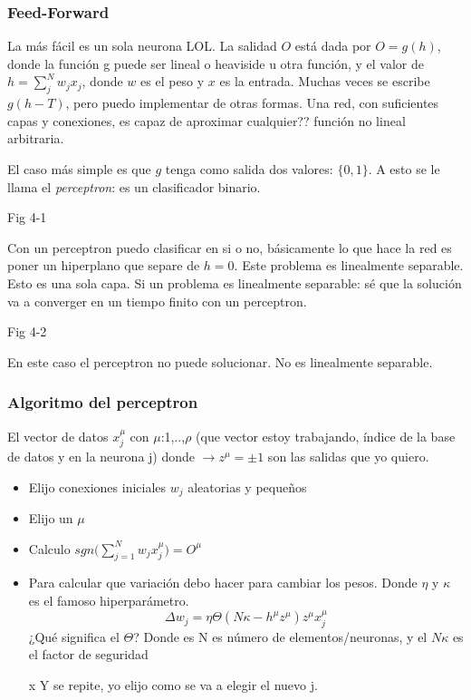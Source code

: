 \subsubsection{Feed-Forward}
La más fácil es un sola neurona LOL. La salidad $O$ está dada por $O= g(h)$, donde la función g puede ser lineal o heaviside u otra función, y el valor de $h= \sum_j^N w_j x_j$,  donde $w$ es el peso y $x$ es la entrada. Muchas veces se escribe $g(h-T)$, pero puedo implementar de otras formas. Una red, con suficientes capas y conexiones, es capaz de aproximar cualquier?? función no lineal  arbitraria.

El caso más simple es que $g$ tenga como salida dos valores: $\{ 0, 1\}$. A esto se le llama el {\sl perceptron}: es un clasificador binario.

Fig 4-1

Con un perceptron puedo clasificar en si o no, básicamente lo que hace  la red es poner un hiperplano que separe de $h=0$. Este problema es linealmente separable. Esto es una sola capa. Si un problema es linealmente separable: sé que la solución va a converger en un tiempo finito con un perceptron.

Fig 4-2

En este caso el perceptron no puede solucionar. No es linealmente separable. 


\subsubsection{Algoritmo del perceptron}

El vector de datos $x_j^{\mu}$ con $\mu$:1,..,$\rho$ (que vector estoy trabajando, índice de la base de datos y en la neurona j) donde $\rightarrow z^\mu=\pm1$ son las salidas que yo quiero.

\begin{itemize}
	\item Elijo conexiones iniciales $w_j$ aleatorias y pequeños
	\item Elijo un $\mu$
	\item Calculo $sgn\big(\sum^N_{j=1} w_j x_j^\mu \big) = O^{\mu}$
	\item Para calcular que variación debo hacer para cambiar los pesos. Donde $\eta$ y $\kappa$ es el famoso hiperparámetro.
	\begin{equation}
		\Delta w_j = \eta \Theta(N\kappa - h^\mu z^\mu) z^\mu x_j^\mu 
	\end{equation}
	¿Qué significa el $\Theta$? Donde es N es número de elementos/neuronas, y el $N\kappa$ es el factor de seguridad
	\item[x] Y se repite, yo elijo como se va a elegir el nuevo j.
\end{itemize}

